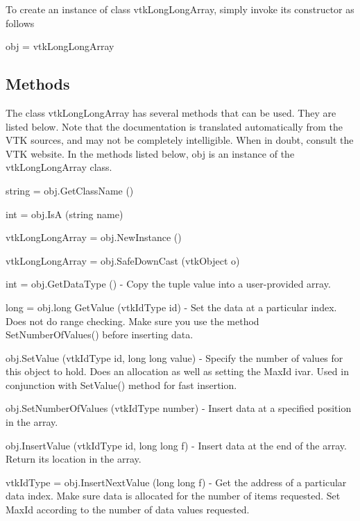 To create an instance of class vtk\-Long\-Long\-Array, simply invoke its constructor as follows \begin{DoxyVerb}  obj = vtkLongLongArray
\end{DoxyVerb}
 \hypertarget{vtkwidgets_vtkxyplotwidget_Methods}{}\subsection{Methods}\label{vtkwidgets_vtkxyplotwidget_Methods}
The class vtk\-Long\-Long\-Array has several methods that can be used. They are listed below. Note that the documentation is translated automatically from the V\-T\-K sources, and may not be completely intelligible. When in doubt, consult the V\-T\-K website. In the methods listed below, {\ttfamily obj} is an instance of the vtk\-Long\-Long\-Array class. 
\begin{DoxyItemize}
\item {\ttfamily string = obj.\-Get\-Class\-Name ()}  
\item {\ttfamily int = obj.\-Is\-A (string name)}  
\item {\ttfamily vtk\-Long\-Long\-Array = obj.\-New\-Instance ()}  
\item {\ttfamily vtk\-Long\-Long\-Array = obj.\-Safe\-Down\-Cast (vtk\-Object o)}  
\item {\ttfamily int = obj.\-Get\-Data\-Type ()} -\/ Copy the tuple value into a user-\/provided array.  
\item {\ttfamily long = obj.\-long Get\-Value (vtk\-Id\-Type id)} -\/ Set the data at a particular index. Does not do range checking. Make sure you use the method Set\-Number\-Of\-Values() before inserting data.  
\item {\ttfamily obj.\-Set\-Value (vtk\-Id\-Type id, long long value)} -\/ Specify the number of values for this object to hold. Does an allocation as well as setting the Max\-Id ivar. Used in conjunction with Set\-Value() method for fast insertion.  
\item {\ttfamily obj.\-Set\-Number\-Of\-Values (vtk\-Id\-Type number)} -\/ Insert data at a specified position in the array.  
\item {\ttfamily obj.\-Insert\-Value (vtk\-Id\-Type id, long long f)} -\/ Insert data at the end of the array. Return its location in the array.  
\item {\ttfamily vtk\-Id\-Type = obj.\-Insert\-Next\-Value (long long f)} -\/ Get the address of a particular data index. Make sure data is allocated for the number of items requested. Set Max\-Id according to the number of data values requested.  

\end{DoxyItemize}
